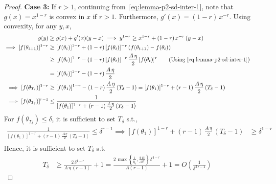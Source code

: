\documentclass{article}
\newcommand{\tht}{\theta_t}
\newcommand{\thtt}{\theta_{t+1}}
\begin{document}
\begin{proof}
\textbf{Case 3:} If $r > 1$, continuing from~\cref{eq:lemma-p2-sd-inter-1}, note that $g(x) = x^{1-r}$ is convex in $x$ if $r > 1$. Furthermore, $g'(x) = (1-r) \, x^{-r}$. Using convexity, for any $y, x$, 
\begin{align*}
g(y) & \geq g(x) + g'(x) (y - x) \implies y^{1 - r} \geq x^{1 - r} +  (1-r) \, x^{-r} \, (y - x) \\
\implies [f(\thtt)]^{1 - r} & \geq [f(\tht)]^{1-r} + (1-r) \, [f(\tht)]^{-r} \, (f(\thtt) - f(\tht)) \\
& \geq [f(\tht)]^{1-r} - (1-r) \, [f(\tht)]^{-r} \,  \frac{A \, \eta}{2} \,  [f(\tht)]^r \tag{Using~\cref{eq:lemma-p2-sd-inter-1}} \\
& = [f(\tht)]^{1-r} - (1-r) \, \frac{A \, \eta}{2} \\
\implies [f(\theta_{T_\delta})]^{1 - r} & \geq [f(\theta_1)]^{1-r} - (1-r) \, \frac{A \, \eta}{2} \, (T_\delta -1) =  [f(\theta_1)]^{1-r} + (r-1) \, \frac{A \, \eta}{2} \, (T_\delta-1)\\
\implies [f(\theta_{T_\delta})]^{r - 1} & \leq \frac{1}{  [f(\theta_1)]^{1-r} + (r-1) \, \frac{A \, \eta}{2} \, (T_\delta-1)}
\end{align*}
For $f(\theta_{T_\delta}) \leq \delta$, it is sufficient to set $T_\delta$ s.t., 
\begin{align*}
\frac{1}{  [f(\theta_1)]^{1-r} + (r-1) \, \frac{A \, \eta}{2} \, (T_\delta-1)} \leq \delta^{r-1} \implies
[f(\theta_1)]^{1-r} + (r-1) \, \frac{A \, \eta}{2} \, (T_\delta-1)  & \geq  \delta^{1-r}  \\
\end{align*}
Hence, it is sufficient to set $T_\delta$ s.t. 
\begin{align*}
T_{\delta} & \geq \frac{2\, \delta^{1-r}}{A \, \eta \, (r-1) \, } + 1 = \frac{2 \, \max\left\{\frac{1}{\bar{\eta}_1}, \frac{2 \, B}{A \delta^r}\right\}\, \delta^{1-r}}{A (r-1)  } + 1  = O \left( \frac{1}{\delta^{2 \, r - 1}} \right)
\end{align*}


\end{proof}
\end{document}
